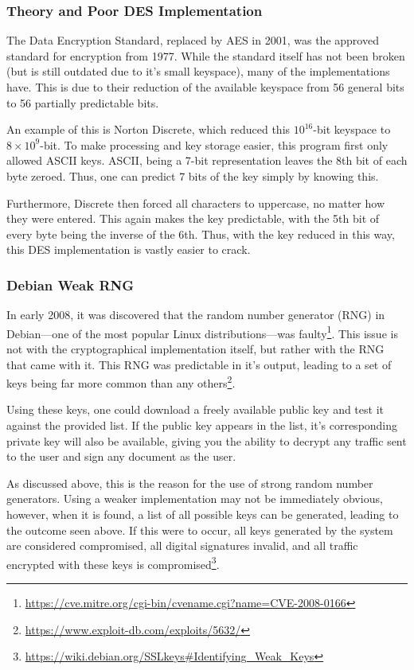 			\subsubsection{Theory and Poor DES Implementation}
				The Data Encryption Standard, replaced by AES in 2001, was the approved standard for encryption from 1977. 
				While the standard itself has not been broken (but is still outdated due to it's small keyspace), 
				many of the implementations have. 
				This is due to their reduction of the available keyspace from 56 general bits to 56 partially predictable bits.

				An example of this is Norton Discrete, which reduced this $10^{16}$-bit keyspace to $8\times10^9$-bit. 
				To make processing and key storage easier, this program first only allowed ASCII keys. 
				ASCII, being a 7-bit representation leaves the 8th bit of each byte zeroed. 
				Thus, one can predict 7 bits of the key simply by knowing this. 

				Furthermore, Discrete then forced all characters to uppercase, no matter how they were entered. 
				This again makes the key predictable, with the 5th bit of every byte being the inverse of the 6th. 
				Thus, with the key reduced in this way, this DES implementation is vastly easier to crack. 

			\subsubsection{Debian Weak RNG}
				In early 2008, it was discovered that the random number generator (RNG) in Debian---one of the most popular Linux distributions---was faulty\footnote{\url{https://cve.mitre.org/cgi-bin/cvename.cgi?name=CVE-2008-0166}}.
				This issue is not with the cryptographical implementation itself, but rather with the RNG that came with it. 
				This RNG was predictable in it's output, leading to a set of keys being far more common than any others\footnote{\url{https://www.exploit-db.com/exploits/5632/}}.

				Using these keys, one could download a freely available public key and test it against the provided list. 
				If the public key appears in the list, it's corresponding private key will also be available, giving you the ability to decrypt any traffic sent to the user and sign any document as the user. 

				As discussed above, this is the reason for the use of strong random number generators. 
				Using a weaker implementation may not be immediately obvious, 
				however, when it is found, a list of all possible keys can be generated, leading to the outcome seen above. 
				If this were to occur, all keys generated by the system are considered compromised, all digital signatures invalid, and all traffic encrypted with these keys is compromised\footnote{\url{https://wiki.debian.org/SSLkeys\#Identifying\_Weak\_Keys}}.
